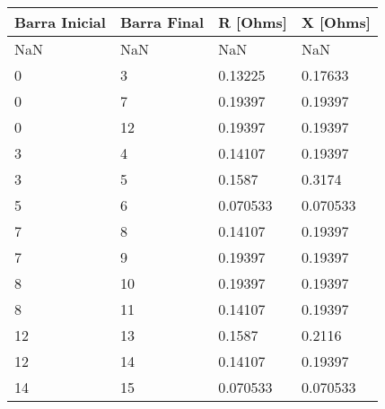 \begin{tabular}{llll}
\toprule
\textbf{Barra Inicial}&\textbf{Barra Final}&\textbf{R [Ohms]}&\textbf{X [Ohms]}\\
\midrule
NaN&NaN&NaN&NaN\\
0&3&0.13225&0.17633\\
0&7&0.19397&0.19397\\
0&12&0.19397&0.19397\\
3&4&0.14107&0.19397\\
3&5&0.1587&0.3174\\
5&6&0.070533&0.070533\\
7&8&0.14107&0.19397\\
7&9&0.19397&0.19397\\
8&10&0.19397&0.19397\\
8&11&0.14107&0.19397\\
12&13&0.1587&0.2116\\
12&14&0.14107&0.19397\\
14&15&0.070533&0.070533\\
\bottomrule
\end{tabular}
